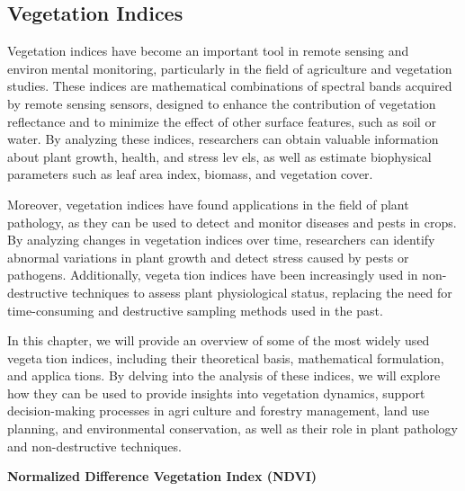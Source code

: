 \documentclass{article}
\begin{document}
{            \subsection{Vegetation Indices}
            \hspace{0.5cm}Vegetation indices have become an important tool in remote sensing and environmental monitoring, particularly in the field of agriculture and vegetation studies. These indices are mathematical combinations of spectral bands acquired by remote sensing sensors, designed to enhance the contribution of vegetation reflectance and to minimize the effect of other surface features, such as soil or water. By analyzing these indices, researchers can obtain valuable information about plant growth, health, and stress levels, as well as estimate biophysical parameters such as leaf area index, biomass, and vegetation cover.\par
            Moreover, vegetation indices have found applications in the field of plant pathology, as they can be used to detect and monitor diseases and pests in crops. By analyzing changes in vegetation indices over time, researchers can identify abnormal variations in plant growth and detect stress caused by pests or pathogens. Additionally, vegetation indices have been increasingly used in non-destructive techniques to assess plant physiological status, replacing the need for time-consuming and destructive sampling methods used in the past.\par
            In this chapter, we will provide an overview of some of the most widely used vegetation indices, including their theoretical basis, mathematical formulation, and applications. By delving into the analysis of these indices, we will explore how they can be used to provide insights into vegetation dynamics, support decision-making processes in agriculture and forestry management, land use planning, and environmental conservation, as well as their role in plant pathology and non-destructive techniques.
            \vspace*{2\baselineskip}
            \newpage
            
                \textbf{Normalized Difference Vegetation Index (NDVI)}
                \vspace*{1\baselineskip}  
                
}
\end{document}
